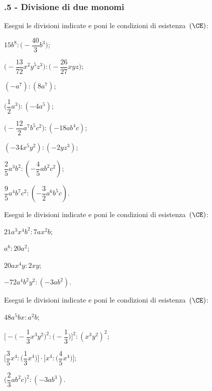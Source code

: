 \subsubsection*{\thechapter.5 - Divisione di due monomi}
\begin{esercizio}[\Ast]
 \label{ese:10.20} %
Esegui le divisioni indicate e poni le condizioni di esistenza~$(\CE)$:
\begin{multicols}{2}
\begin{enumeratea}
\spazielenx
 \item $15b^{8}:\bigg(-{\dfrac{40}{3}}b^{3}\bigg)$;
 \item $\bigg(-{\dfrac{13}{72}}x^{2}y^{5}z^{3}\bigg):\bigg(-{\dfrac{26}{27}}xyz\bigg)$;
 \item $(-a^{7}):(8a^{7})$;
 \item $\bigg(\dfrac{1}{2}a^{3}\bigg):(-4a^{5})$;
 \item $\bigg(-{\dfrac{12}{2}}a^{7}b^{5}c^{2}\bigg):(-18ab^{4}c)$;
 \item $(-34x^{5}y^{2}):(-2yz^{3})$;
 \item $\dfrac{2}{5}a^3b^2:\left(-\dfrac{4}{5}ab^2c^2\right)$;
 \item $\dfrac{9}{5}a^4b^7c^2:\left(-\dfrac{3}{2}a^6b^5c\right)$.
\end{enumeratea}
\end{multicols}
\end{esercizio}

\begin{esercizio}
 \label{ese:10.21} %
Esegui le divisioni indicate e poni le condizioni di esistenza~$(\CE)$:
\begin{multicols}{2}
\begin{enumeratea}
 \item $21a^{3}x^{4}b^{2}:7ax^{2}b$;
 \item $a^{6}:20a^{2}$;
 \item $20ax^{4}y:2xy$;
 \item $-72a^{4}b^{2}y^{2}:(-3ab^{2})$.
\end{enumeratea}
\end{multicols}
\end{esercizio}

\begin{esercizio}[\Ast]
 \label{ese:10.22} %
Esegui le divisioni indicate e poni le condizioni di esistenza~$(\CE)$:
\begin{multicols}{2}
\begin{enumeratea}
 \item $48a^{5}bx:a^{2}b$;
 \item $\Bigg[-\bigg(-{\dfrac{1}{3}}x^{3}y^{2}\bigg)^{2}:\bigg(-{\dfrac{1}{3}}\bigg)\Bigg]^{2}:(x^{3}y^{2})^{2}$;
 \item $\Bigg[\dfrac{3}{5}x^{4}:\bigg(\dfrac{1}{3}x^{4}\bigg)\Bigg]\cdot\Bigg[x^{4}:\bigg(\dfrac{4}{5}x^{4}\bigg)\Bigg]$;
 \item $\bigg(\dfrac{2}{3}ab^{2}c\bigg)^{2}:(-3ab^{3})$.
\end{enumeratea}
\end{multicols}
\end{esercizio}

